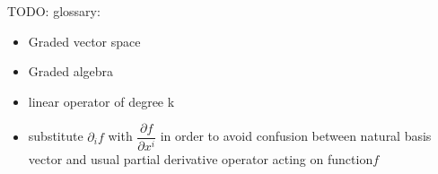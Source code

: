 \documentclass[a4paper,12pt]{scrartcl}
\begin{document}
\begin{landscape}
\begin{minipage}{0.46 \linewidth}
	\end{minipage}
	
	\begin{minipage}{0.46 \linewidth}
\newpage
	\end{minipage}
	\hspace{1cm}
	\begin{minipage}{0.46 \linewidth}
 		TODO: glossary:
 			\begin{itemize}
 				\item Graded vector space
 				\item Graded algebra
 				\item linear operator of degree k
 				\item substitute $\partial_i f $ with $\dfrac{\partial f}{\partial x^i}$ in order to avoid confusion between natural basis vector and usual partial derivative operator acting on function$f$
 			\end{itemize}
	\end{minipage} 
    
  \end{landscape}
\end{document}
